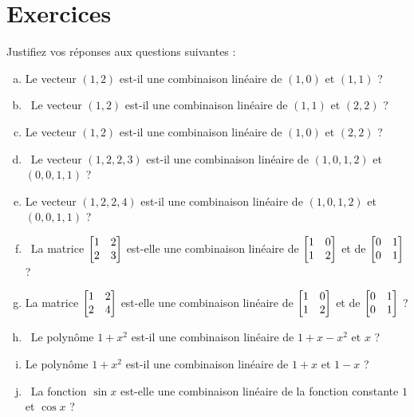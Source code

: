 \section*{Exercices}



 \begin{prob} \label{prob06.1} Justifiez vos réponses aux questions suivantes :
\medskip
\begin{enumerate}[a)]
\item Le vecteur $(1,2)$ est-il une combinaison linéaire de $(1,0)$ et $(1,1)$ ?
\medskip

\item\sov~Le vecteur $(1,2)$ est-il une combinaison linéaire de $(1,1)$ et $(2,2)$ ?
\medskip

\item Le vecteur $(1,2)$ est-il une combinaison linéaire de $(1,0)$ et $(2,2)$ ?
\medskip

\item\sov~Le vecteur $(1,2,2,3)$ est-il une combinaison linéaire de $(1,0,1,2)$ et $(0,0,1,1)$ ?
\medskip

\item Le vecteur $(1,2,2,4)$ est-il une combinaison linéaire de $(1,0,1,2)$ et $(0,0,1,1)$ ?
\medskip

\item\sov~La matrice $\bmatrix 1&2\\2&3\endbmatrix $ est-elle une combinaison linéaire de $\bmatrix 1&0\\1&2\endbmatrix $ et de $\bmatrix 0&1\\0&1\endbmatrix $ ?
\medskip

\item La matrice $\bmatrix 1&2\\2&4\endbmatrix $ est-elle une combinaison linéaire de  $\bmatrix 1&0\\ 1&2\endbmatrix$ et de $ \bmatrix 0&1\\ 0&1\endbmatrix $ ?
\medskip

\item\sov~Le polynôme $1+x^2$ est-il une combinaison linéaire de $1+x-x^2$ et $x$ ?
\medskip

\item Le polyn\^ome $1+x^2$ est-il une combinaison linéaire de  $1+x$ et $1-x$ ?
\medskip

\item\sov~La fonction $\sin x$ est-elle une combinaison linéaire de la fonction constante $1$ et $\cos x$ ?
\medskip


\end{enumerate}
\end{prob}
